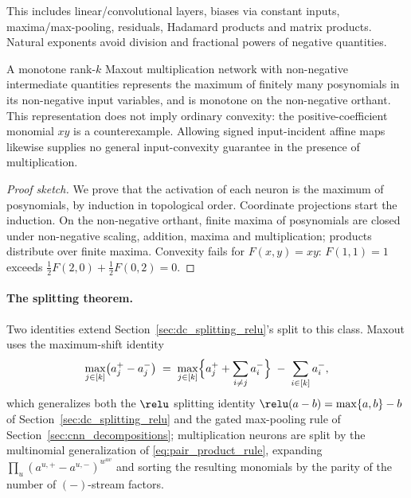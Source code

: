 This includes linear/convolutional layers, biases via constant inputs, maxima/max-pooling, residuals, Hadamard products and matrix products. Natural exponents avoid division and fractional powers of negative quantities.

\begin{proposition}\label{prop:posynomial_representation}
A monotone rank-$k$ Maxout multiplication network with non-negative intermediate quantities represents the maximum of finitely many posynomials in its non-negative input variables, and is monotone on the non-negative orthant. This representation does not imply ordinary convexity: the positive-coefficient monomial $xy$ is a counterexample. Allowing signed input-incident affine maps likewise supplies no general input-convexity guarantee in the presence of multiplication.\end{proposition}

\begin{proof}[Proof sketch]
We prove that the activation of each neuron is the maximum of posynomials, by induction in topological order. Coordinate projections start the induction. On the non-negative orthant, finite maxima of posynomials are closed under non-negative scaling, addition, maxima and multiplication; products distribute over finite maxima. Convexity fails for $F(x,y)=xy$: $F(1,1)=1$ exceeds $\tfrac12F(2,0)+\tfrac12F(0,2)=0$.
\end{proof}

\paragraph{The splitting theorem.}
Two identities extend Section~\ref{sec:dc_splitting_relu}'s split to this class. Maxout uses the maximum-shift identity
\begin{equation}
	\max_{j \in [k]}\bigl(a_j^{+} - a_j^{-}\bigr)
	\;=\;
	\max_{j \in [k]}\Bigl\{a_j^{+} + \sum_{i \neq j} a_i^{-}\Bigr\}
	\;-\;
	\sum_{i \in [k]} a_i^{-},
	\label{eq:maxout_split_identity}
\end{equation}
which generalizes both the $\relu$ splitting identity $\relu(a - b) = \max\{a, b\} - b$ of Section~\ref{sec:dc_splitting_relu} and the gated max-pooling rule of Section~\ref{sec:cnn_decompositions}; multiplication neurons are split by the multinomial generalization of \eqref{eq:pair_product_rule}, expanding $\prod_u (a^{u,+} - a^{u,-})^{w^{uv}}$ and sorting the resulting monomials by the parity of the number of $(-)$-stream factors.

